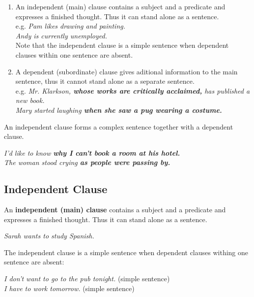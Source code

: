 \documentclass[hidelinks,10pt,a4paper]{article}
\begin{document}
\begin{enumerate}[label=(\alph*)]
	\item An independent (main) clause contains a subject and a predicate and expresses a finished thought. Thus it can stand alone as a sentence.\\
		e.g. \textit{Pam likes drawing and painting.\\
		Andy is currently unemployed.}\\

		Note that the independent clause is a simple sentence when dependent clauses within one sentence are absent.

	\item A dependent (subordinate) clause gives aditional information to the main sentence, thus it cannot stand alone as a separate sentence.\\
		e.g. \textit{Mr. Klarkson, \textbf{whose works are critically acclaimed,} has published a new book. \\
		Mary started laughing \textbf{when she saw a pug wearing a costume.} }
\end{enumerate}

An independent clause forms a complex sentence together with a dependent clause.

\begin{center}
	\textit{I'd like to know \textbf{why I can't book a room at his hotel.}\\
	The woman stood crying \textbf{as people were passing by.} }
\end{center}

\subsection{Independent Clause}
An \textbf{independent (main) clause} contains a subject and a predicate and expresses a finished thought. Thus it can stand alone as a sentence.

\begin{center}
	\textit{Sarah wants to study Spanish.}
\end{center}

The independent clause is a simple sentence when dependent clauses withing one sentence are absent:

\begin{center}
	\textit{I don't want to go to the pub tonight.} (simple sentence)\\
	\textit{I have to work tomorrow.} (simple sentence)
\end{center}
\end{document}
